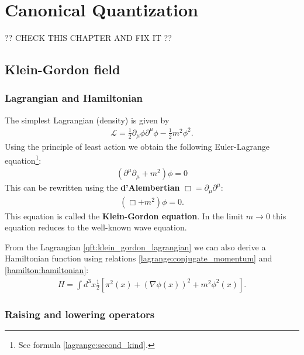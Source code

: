 \chapter{Canonical Quantization}

    ?? CHECK THIS CHAPTER AND FIX IT ??

\section{Klein-Gordon field}
\subsection{Lagrangian and Hamiltonian}

    The simplest Lagrangian (density) is given by
    \begin{gather}
        \label{qft:klein_gordon_lagrangian}
        \mathcal{L} = \frac{1}{2}\partial_\mu\phi\partial^\mu\phi - \frac{1}{2}m^2\phi^2.
    \end{gather}
    Using the principle of least action we obtain the following Euler-Lagrange equation\footnote{See formula \ref{lagrange:second_kind}.}:
    \begin{gather}
        \left(\partial^\mu\partial_\mu + m^2\right)\phi = 0
    \end{gather}
    This can be rewritten using the \textbf{d'Alembertian} $\Box = \partial_\mu\partial^\mu$:
    \begin{gather}
        \label{qft:klein_gordon_equation}
        (\Box+m^2)\phi = 0.
    \end{gather}
    This equation is called the \textbf{Klein-Gordon equation}. In the limit $m\rightarrow0$ this equation reduces to the well-known wave equation.

    From the Lagrangian \ref{qft:klein_gordon_lagrangian} we can also derive a Hamiltonian function using relations \ref{lagrange:conjugate_momentum} and \ref{hamilton:hamiltonian}:
    \begin{gather}
        \label{qft:klein_gordon_hamiltonian}
        H = \int d^3x \frac{1}{2}\left[\pi^2(x) + (\nabla\phi(x))^2 + m^2\phi^2(x)\right].
    \end{gather}

\subsection{Raising and lowering operators}

